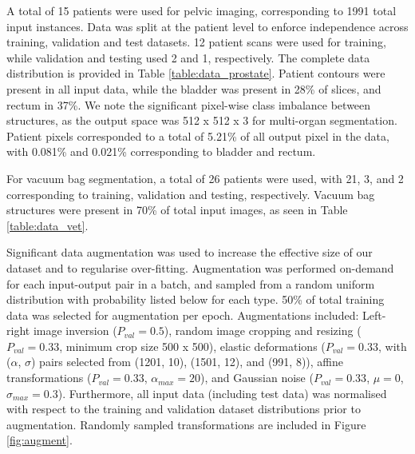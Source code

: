A total of 15 patients were used for pelvic imaging, corresponding to 1991 total input instances. Data was split at the patient level to enforce independence across training, validation and test datasets. 12 patient scans were used for training, while validation and testing used 2 and 1, respectively. The complete data distribution is provided in Table \ref{table:data_prostate}. Patient contours were present in all input data, while the bladder was present in 28\% of slices, and rectum in 37\%. We note the significant pixel-wise class imbalance between structures, as the output space was 512 x 512 x 3 for multi-organ segmentation. Patient pixels corresponded to a total of 5.21\%
of all output pixel in the data, with 0.081\% and 0.021\%
corresponding to bladder and rectum.



For vacuum bag segmentation, a total of 26 patients were used, with 21, 3, and 2 corresponding to training, validation and testing, respectively. Vacuum bag structures were present in 70\% of total input images, as seen in Table \ref{table:data_vet}.




Significant data augmentation was used to increase the effective size of our dataset and to regularise over-fitting.
Augmentation was performed on-demand for each input-output pair in a batch, and sampled from a random uniform distribution with probability listed below for each type. 50\% of total training data was selected for augmentation per epoch. Augmentations included: Left-right image inversion ($P_{val}=0.5$), random image cropping and resizing ($P_{val}=0.33$, minimum crop size 500 x 500), elastic deformations ($P_{val}=0.33$, with ($\alpha$, $\sigma$) pairs selected from (1201, 10), (1501, 12), and (991, 8)), affine transformations ($P_{val}=0.33$, $\alpha_{max}=20$), and Gaussian noise ($P_{val}=0.33$, $\mu=0$, $\sigma_{max}=0.3$). Furthermore, all input data (including test data) was normalised with respect to the training and validation dataset distributions prior to augmentation. Randomly sampled transformations are included in Figure \ref{fig:augment}.

